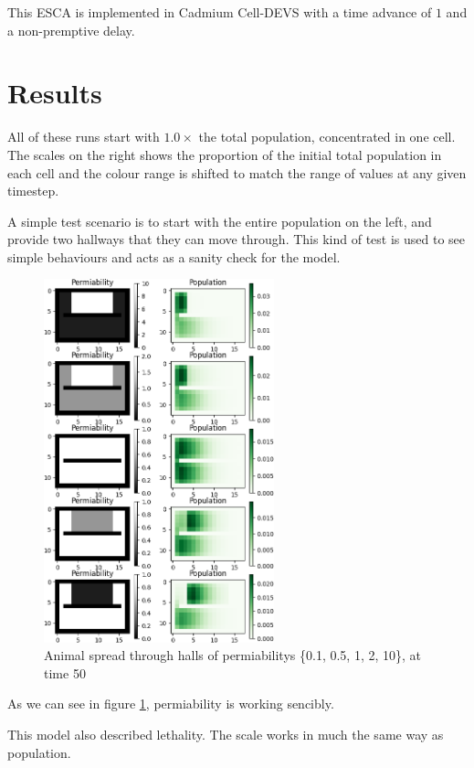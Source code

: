 \documentclass[twocolumn]{article}
\begin{document}
This ESCA is implemented in Cadmium Cell-DEVS with a time advance of $1$ and a non-premptive delay.

\section{Results}
\FloatBarrier
All of these runs start with $1.0\times$ the total population, concentrated in one cell. The scales on the right shows the proportion of the initial total population in each cell and the colour range is shifted to match the range of values at any given timestep.

A simple test scenario is to start with the entire population on the left, and provide two hallways that they can move through. This kind of test is used to see simple behaviours and acts as a sanity check for the model.

\begin{figure}[h!]
	\begin{center}
		\includegraphics[width=18em]{halls_permeability.png}
		\caption{Animal spread through halls of permiabilitys \{0.1, 0.5, 1, 2, 10\}, at time 50}
		\label{fig:halls_permeability}
	\end{center}
\end{figure}

As we can see in figure \ref{fig:halls_permeability}, permiability is working sencibly.

This model also described lethality. The scale works in much the same way as population.
\end{document}
